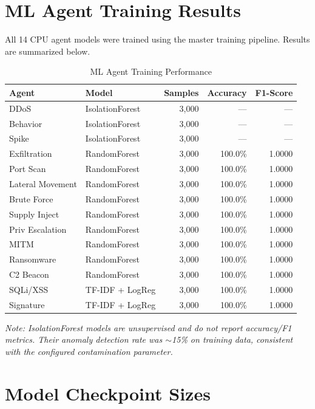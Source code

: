 \documentclass[12pt, a4paper]{report}
\begin{document}
\section{ML Agent Training Results}

All 14 CPU agent models were trained using the master training pipeline. Results are summarized below.

\begin{table}[H]
\centering
\caption{ML Agent Training Performance}
\label{tab:training_results}
\begin{tabular}{l l r r r}
\toprule
\textbf{Agent} & \textbf{Model} & \textbf{Samples} & \textbf{Accuracy} & \textbf{F1-Score} \\
\midrule
DDoS & IsolationForest & 3,000 & — & — \\
Behavior & IsolationForest & 3,000 & — & — \\
Spike & IsolationForest & 3,000 & — & — \\
\midrule
Exfiltration & RandomForest & 3,000 & 100.0\% & 1.0000 \\
Port Scan & RandomForest & 3,000 & 100.0\% & 1.0000 \\
Lateral Movement & RandomForest & 3,000 & 100.0\% & 1.0000 \\
Brute Force & RandomForest & 3,000 & 100.0\% & 1.0000 \\
Supply Inject & RandomForest & 3,000 & 100.0\% & 1.0000 \\
Priv Escalation & RandomForest & 3,000 & 100.0\% & 1.0000 \\
MITM & RandomForest & 3,000 & 100.0\% & 1.0000 \\
Ransomware & RandomForest & 3,000 & 100.0\% & 1.0000 \\
C2 Beacon & RandomForest & 3,000 & 100.0\% & 1.0000 \\
\midrule
SQLi/XSS & TF-IDF + LogReg & 3,000 & 100.0\% & 1.0000 \\
Signature & TF-IDF + LogReg & 3,000 & 100.0\% & 1.0000 \\
\bottomrule
\end{tabular}
\end{table}

\textit{Note: IsolationForest models are unsupervised and do not report accuracy/F1 metrics. Their anomaly detection rate was $\sim$15\% on training data, consistent with the configured contamination parameter.}

\section{Model Checkpoint Sizes}
\end{document}
